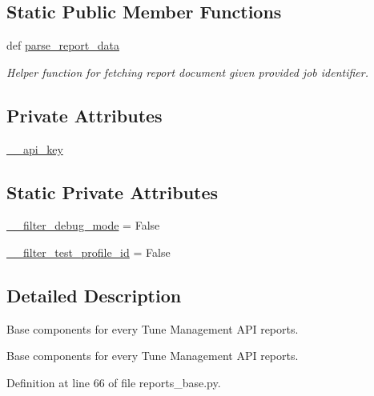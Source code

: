 \subsection*{Static Public Member Functions}
\begin{DoxyCompactItemize}
\item 
def \hyperlink{classtune_1_1management_1_1reports_1_1reports__base_1_1ReportsBase_ab256e31b545798be9e0d3a00513bcf7a}{parse\-\_\-report\-\_\-data}
\begin{DoxyCompactList}\small\item\em Helper function for fetching report document given provided job identifier. \end{DoxyCompactList}\end{DoxyCompactItemize}
\subsection*{Private Attributes}
\begin{DoxyCompactItemize}
\item 
\hyperlink{classtune_1_1management_1_1reports_1_1reports__base_1_1ReportsBase_a11cc8a3041bc8b00d69f19c743db691c}{\-\_\-\-\_\-api\-\_\-key}
\end{DoxyCompactItemize}
\subsection*{Static Private Attributes}
\begin{DoxyCompactItemize}
\item 
\hyperlink{classtune_1_1management_1_1reports_1_1reports__base_1_1ReportsBase_a90eca5e0c1887df285f34643969652a1}{\-\_\-\-\_\-filter\-\_\-debug\-\_\-mode} = False
\item 
\hyperlink{classtune_1_1management_1_1reports_1_1reports__base_1_1ReportsBase_a00dede100fc4e3a6468f15a057bfc1c1}{\-\_\-\-\_\-filter\-\_\-test\-\_\-profile\-\_\-id} = False
\end{DoxyCompactItemize}


\subsection{Detailed Description}
Base components for every Tune Management A\-P\-I reports. 

Base components for every Tune Management A\-P\-I reports. 

Definition at line 66 of file reports\-\_\-base.\-py.




